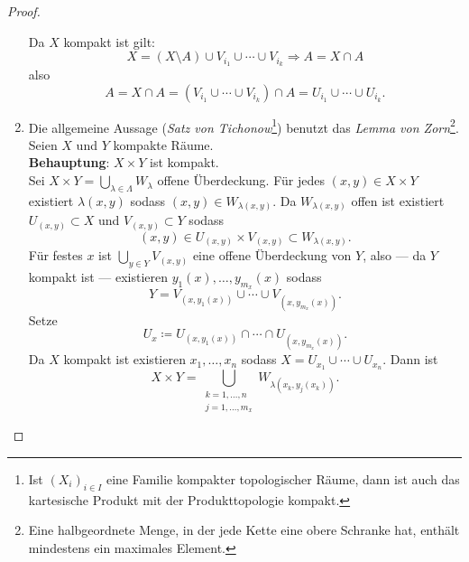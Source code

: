 \begin{theorem}
\begin{proof}
\begin{enumerate}
        Da \( X \) kompakt ist gilt:
        \begin{equation*}
          X = (X \setminus A) \cup V_{i_1} \cup \cdots \cup V_{i_k} \Rightarrow A = X \cap A
        \end{equation*}
        also
        \begin{equation*}
          A = X \cap A = \left( V_{i_1} \cup \cdots \cup V_{i_k} \right) \cap A = U_{i_1} \cup \cdots \cup U_{i_k}\text{.}
        \end{equation*}
      \item Die allgemeine Aussage (\emph{Satz von Tichonow}\footnote{Ist \( {(X_i)}_{i \in I} \) eine Familie kompakter topologischer Räume, dann ist auch das kartesische Produkt mit der Produkttopologie kompakt.}) benutzt das \emph{Lemma von Zorn}\footnote{Eine halbgeordnete Menge, in der jede Kette eine obere Schranke hat, enthält mindestens ein maximales Element.}. \\
        Seien \( X \) und \( Y \) kompakte Räume. \\
        \textbf{Behauptung}: \( X \times Y \) ist kompakt. \\
        Sei \( X \times Y = \bigcup_{\lambda \in \Lambda} W_\lambda \) offene Überdeckung. Für jedes \( (x, y) \in X \times Y \) existiert \( \lambda(x, y) \) sodass \( (x,y) \in W_{\lambda(x,y)} \). Da \( W_{\lambda(x,y)} \) offen ist existiert \( U_{(x,y)} \subset X \) und \( V_{(x,y)} \subset Y \) sodass
        \begin{equation*}
          (x,y) \in U_{(x,y)} \times V_{(x,y)} \subset W_{\lambda(x,y)}\text{.}
        \end{equation*}
        Für festes \( x \) ist \( \bigcup_{y \in Y} V_{(x,y)} \) eine offene Überdeckung von \( Y \), also --- da \( Y \) kompakt ist --- existieren \( y_1(x),\dots,y_{m_x}(x) \) sodass
        \begin{equation*}
          Y = V_{(x, y_1(x))} \cup \cdots \cup V_{(x,y_{m_x}(x))}\text{.}
        \end{equation*}
        Setze
        \begin{equation*}
          U_x \coloneqq U_{(x,y_1(x))} \cap \cdots \cap U_{(x, y_{m_x}(x))}\text{.}
        \end{equation*}
        Da \( X \) kompakt ist existieren \( x_1, \dots, x_n \) sodass \( X = U_{x_1} \cup \cdots \cup U_{x_n} \). Dann ist
        \begin{equation*}
          X \times Y = \bigcup_{\substack{k = 1, \dots, n \\ j = 1, \dots, m_x}}W_{\lambda(x_k, y_j(x_k))}\text{.}
        \end{equation*}
    \end{enumerate}
  \end{proof}
\end{theorem}

